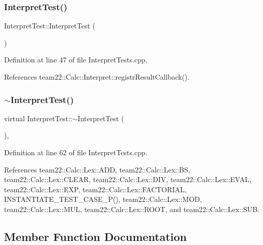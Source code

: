\subsubsection{\texorpdfstring{Interpret\+Test()}{InterpretTest()}}
{\footnotesize\ttfamily Interpret\+Test\+::\+Interpret\+Test (\begin{DoxyParamCaption}{ }\end{DoxyParamCaption})\hspace{0.3cm}{\ttfamily [inline]}}



Definition at line 47 of file Interpret\+Tests.\+cpp.



References team22\+::\+Calc\+::\+Interpret\+::registr\+Result\+Callback().

\mbox{\label{struct_interpret_test_abd93b9443a1b18087a2c879e7664af00}} 
\subsubsection{\texorpdfstring{$\sim$\+Interpret\+Test()}{~InterpretTest()}}
{\footnotesize\ttfamily virtual Interpret\+Test\+::$\sim$\+Interpret\+Test (\begin{DoxyParamCaption}{ }\end{DoxyParamCaption})\hspace{0.3cm}{\ttfamily [inline]}, {\ttfamily [virtual]}}



Definition at line 62 of file Interpret\+Tests.\+cpp.



References team22\+::\+Calc\+::\+Lex\+::\+A\+DD, team22\+::\+Calc\+::\+Lex\+::\+BS, team22\+::\+Calc\+::\+Lex\+::\+C\+L\+E\+AR, team22\+::\+Calc\+::\+Lex\+::\+D\+IV, team22\+::\+Calc\+::\+Lex\+::\+E\+V\+AL, team22\+::\+Calc\+::\+Lex\+::\+E\+XP, team22\+::\+Calc\+::\+Lex\+::\+F\+A\+C\+T\+O\+R\+I\+AL, I\+N\+S\+T\+A\+N\+T\+I\+A\+T\+E\+\_\+\+T\+E\+S\+T\+\_\+\+C\+A\+S\+E\+\_\+\+P(), team22\+::\+Calc\+::\+Lex\+::\+M\+OD, team22\+::\+Calc\+::\+Lex\+::\+M\+UL, team22\+::\+Calc\+::\+Lex\+::\+R\+O\+OT, and team22\+::\+Calc\+::\+Lex\+::\+S\+UB.



\subsection{Member Function Documentation}
\mbox{\label{struct_interpret_test_a8dd2550d1b3e604db0230c2a3f4807a5}} 
